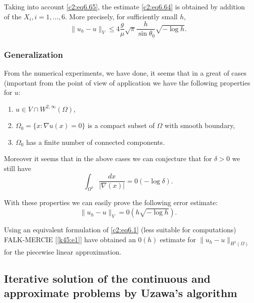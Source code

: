  Taking into account \eqref{c2:eq6.65}, the estimate \eqref{c2:eq6.64} is obtained by
 addition of the $X_i, i=1,\ldots,6$. More precisely, for sufficiently 
 small $h$,  
 \begin{equation}
\parallel u_h-u\parallel_V \leq 4 \frac{g}{\mu}\sqrt{\pi}\frac{h}{\sin \theta_0}
\sqrt{-\log h}.\tag{6.84}\label{c2:eq6.84} 
 \end{equation} 

 \subsubsection{Generalization}\label{c2:sss6.8.4}

From the numerical experiments, we  have done, it seems that in a
great of cases (important from the  point of view of application we
have the following properties for 
 $u$: 
 \begin{enumerate}[(1)]
\item $u \in V \cap W^{2,\infty}(\Omega)$,
\item $\Omega_0 = \{x : \nabla u (x) = 0\}$ is a compact subset
  of $\Omega$ with smooth boundary,  
\item $\Omega_0$ has a finite number of connected components.
 \end{enumerate} 
 
 Moreover it seems that in the above cases we can conjecture that for
 $\delta >0$ we still have 
 \begin{equation}
\int_{\Omega^\delta}\frac{dx}{|\nabla (x)|} = 0 (-\log
\delta). \tag{6.85}\label{c2:eq6.85} 
 \end{equation} 

With  these properties we can easily prove the following error
estimate: 
$$
\parallel u_h-u\parallel_V = 0 \left(h \sqrt{-\log h}\right).
$$

\begin{remark}\label{c2:rem6.8}%
Using an equivalent formulation of \eqref{c2:eq6.1} (less suitable  for
computations) FALK-MERCIE [\ref{k45:e1}] have obtained an $0 (h)$ estimate for
$\parallel u_h -u\parallel_{H^1(\Omega)}$ for the piecewise linear
approximation.
 \end{remark}

\subsection{Iterative solution of the continuous and approximate
  problems by Uzawa's algorithm}\label{c2:ss6.9} 


